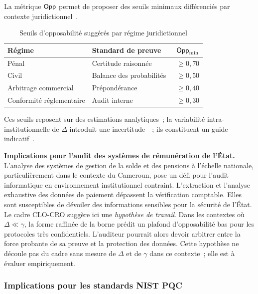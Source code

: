 \begin{sloppypar}
La m\'etrique $\mathsf{Opp}$ permet de proposer des seuils minimaux
diff\'erenci\'es par contexte juridictionnel~\cite{Kerr04,Casey11,Mason07}.

\begin{table}[htbp]
\centering
\caption{Seuils d'opposabilit\'e sugg\'er\'es par r\'egime juridictionnel}
\label{tab:seuils_opposabilite}
\begin{tabular}{@{}p{3.5cm}p{3.5cm}c@{}}
\toprule
\textbf{R\'egime} & \textbf{Standard de preuve} & \textbf{$\mathsf{Opp}_{\min}$} \\
\midrule
P\'enal & Certitude raisonn\'ee~\cite{Blackstone1769,Wigmore1983}
  & $\ge 0{,}70$ \\
Civil & Balance des probabilit\'es~\cite{Federal1988}
  & $\ge 0{,}50$ \\
Arbitrage commercial & Pr\'epond\'erance~\cite{Born2014}
  & $\ge 0{,}40$ \\
Conformit\'e r\'eglementaire & Audit interne~\cite{COSO2013}
  & $\ge 0{,}30$ \\
\bottomrule
\end{tabular}
\end{table}

Ces seuils reposent sur des estimations analytiques~; la variabilit\'e
intra-institutionnelle de $\Delta$ introduit une
incertitude~\cite{Kahneman11}~; ils constituent un guide
indicatif~\cite{Casey11}.

\noindent\textbf{Implications pour l'audit des syst\`emes de
r\'emun\'eration de l'\'Etat.} L'analyse des syst\`emes de gestion de la
solde et des pensions \`a l'\'echelle nationale, particuli\`erement dans
le contexte du Cameroun, pose un d\'efi pour l'audit
informatique en environnement institutionnel contraint. L'extraction et
l'analyse exhaustive des donn\'ees de paiement d\'epassent la v\'erification
comptable. Elles sont susceptibles de d\'evoiler
des informations sensibles pour la s\'ecurit\'e de l'\'Etat. Le cadre
CLO-CRO sugg\`ere ici une \emph{hypoth\`ese de travail}. Dans les contextes o\`u
$\Delta \ll \gamma$, la forme raffin\'ee de la borne pr\'edit un plafond
d'opposabilit\'e bas pour les protocoles tr\`es confidentiels. L'auditeur
pourrait alors devoir arbitrer entre la force probante de sa preuve et
la protection des donn\'ees. Cette hypoth\`ese ne d\'ecoule pas du cadre
sans mesure de $\Delta$ et de $\gamma$ dans ce contexte~; elle est \`a
\'evaluer empiriquement.

\subsubsection{Implications pour les standards NIST PQC}
\label{subsubsec:implications_nist_pqc}


\end{sloppypar}
